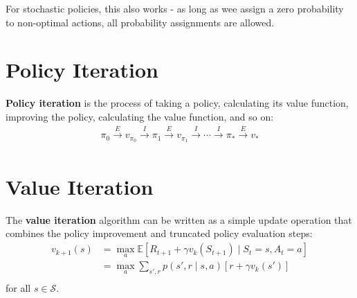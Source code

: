 \documentclass[a4paper,11pt,reqno]{amsart}
\newcounter{prob_counter}
\begin{document}
For stochastic policies, this also works - as long as wee assign a zero probability to non-optimal actions, all probability assignments are allowed. 

\section*{Policy Iteration}
\textbf{Policy iteration} is the process of taking a policy, calculating its value function, improving the policy, calculating the value function, and so on:
\begin{align}
\pi _0 \xrightarrow[]{E} v_{\pi _0} \xrightarrow[]{I} \pi _1 \xrightarrow[]{E} v_{\pi _1} \xrightarrow[]{I} \cdots  \xrightarrow[]{I}\pi _* \xrightarrow[]{E}v_{*}
\end{align}


\section*{Value Iteration}
The \textbf{value iteration} algorithm can be written as a simple update operation that combines the policy improvement and truncated policy evaluation steps:
\begin{align}
v_{k+1}(s) &= \max_a \mathbb{E}\left[ R_{t+1} + \gamma v_k(S_{t+1}) \mid S_{t}=s, A_{t}=a \right]  \\
&= \max_a \sum_{s', r} p(s', r \mid s, a) \left[ r + \gamma v_k(s') \right]  \\
\end{align}
for all $s \in  \mathcal{S}$. 
\end{document}
